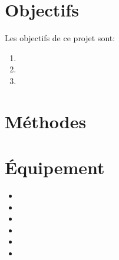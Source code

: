 \documentclass{Thesis}
\begin{document}
\section*{Objectifs}
Les objectifs de ce projet sont:
\begin{enumerate}
    \setlength\itemsep{1mm}
    \item 
    \item 
    \item 
\end{enumerate}

\section*{Méthodes}

\section*{Équipement}
\begin{multicols}{2}
\begin{itemize}
    \setlength\itemsep{1mm}
    \item 
    \item 
    \item 
    \item 
    \item 
    \item 
\end{itemize}
\end{multicols}

\newpage
\printbibliography
\end{document}
